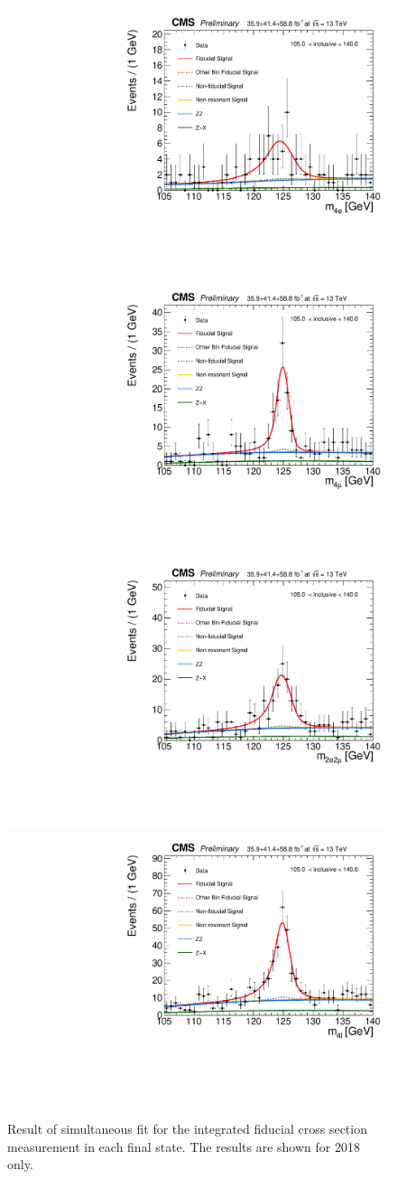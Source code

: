 \begin{figure}[!h]
	\centering
	\includegraphics[width=0.45\linewidth]{Figures/results/fiducial/comb/unblind_Feb25/data_unfoldwith_SM_125_v3_mass4l_4e_recobin0.pdf}
	\includegraphics[width=0.45\linewidth]{Figures/results/fiducial/comb/unblind_Feb25/data_unfoldwith_SM_125_v3_mass4l_4mu_recobin0.pdf} \\
	\includegraphics[width=0.45\linewidth]{Figures/results/fiducial/comb/unblind_Feb25/data_unfoldwith_SM_125_v3_mass4l_2e2mu_recobin0.pdf} 
	\includegraphics[width=0.45\linewidth]{Figures/results/fiducial/comb/unblind_Feb25/data_unfoldwith_SM_125_v3_mass4l_4l_recobin0.pdf} 
	\caption{Result of simultaneous fit for the integrated fiducial cross section measurement in each final state. The results are shown for 2018 only. \label{fig:fiducialfit}}
\end{figure}

